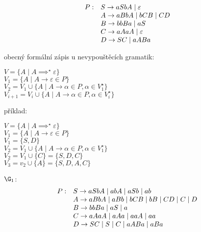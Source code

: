 \[
    \begin{array}{l l}
        P: & S \rightarrow aSbA \mid \varepsilon \\
           & A \rightarrow aBbA \mid bCB \mid CD \\
           & B \rightarrow bbBa \mid aS \\
           & C \rightarrow aAaA \mid \varepsilon \\
           & D \rightarrow SC \mid aABa \\
    \end{array}
\]


obecný formální zápis u nevypouštěcích gramatik:

$V = \{A \mid A \implies^{\star} \varepsilon \}$\\
$V_1 = \{A \mid A \rightarrow \varepsilon \in P\}$\\
$V_2 = V_1 \cup \{A \mid A \rightarrow \alpha \in P, \alpha \in V_1^{\star}\}$\\
$V_{i+1} = V_i \cup \{A \mid A \rightarrow \alpha \in P, \alpha \in V_i^{\star}\}$\\

\begin{minipage}{0.5\textwidth}
příklad: 

$V = \{A \mid A \implies^{\star} \varepsilon \}$\\
$V_1 = \{A \mid A \rightarrow \varepsilon \in P\}$\\
$V_1 = \{S, D\}$\\
$V_2 = V_1 \cup \{A \mid A \rightarrow \alpha \in P, \alpha \in V_1^{\star}\}$\\
$V_2 = V_1 \cup \{C\} = \{S, D, C\}$\\
$V_3 = v_2 \cup \{A\} = \{S, D, A, C\}$        


\end{minipage}
\begin{minipage}{0.5\textwidth}
$\G_1$:
    \[
    \begin{array}{l l}
        P: & S \rightarrow aSbA \mid abA \mid aSb \mid ab  \\
           & A \rightarrow aBbA \mid aBb \mid bCB \mid bB \mid CD \mid C \mid D \\
           & B \rightarrow bbBa \mid aS \mid a\\
           & C \rightarrow aAaA \mid aAa \mid aaA \mid aa \\
           & D \rightarrow SC \mid S \mid C \mid aABa \mid aBa \\
    \end{array}
\]

\end{minipage}


